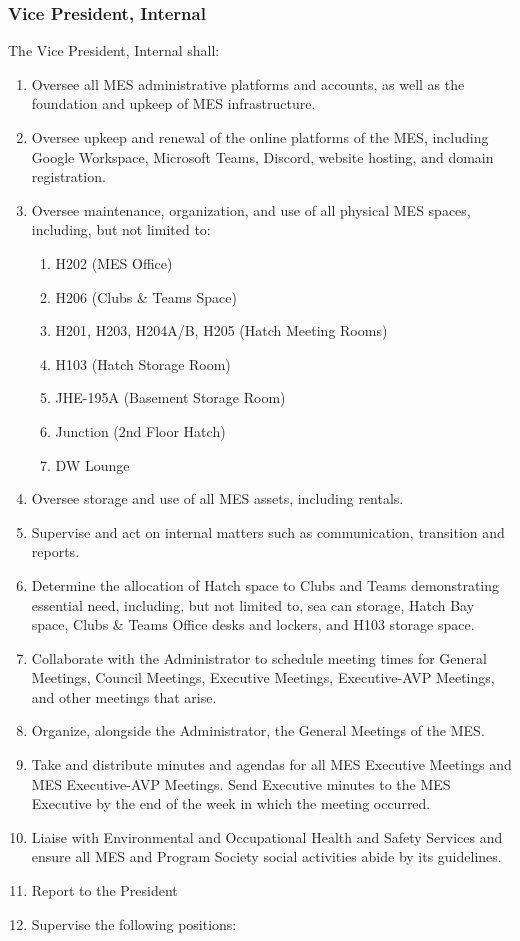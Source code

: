 \subsubsection{Vice President,
 Internal}
\label{vice-president-internal}
The Vice President, Internal shall:

\begin{enumerate}
 \item
  Oversee all MES administrative platforms and accounts, as well as the
  foundation and upkeep of MES infrastructure.
 \item
  Oversee upkeep and renewal of the online platforms of the MES,
  including Google Workspace, Microsoft Teams, Discord, website hosting,
  and domain registration.
 \item
  Oversee maintenance, organization, and use of all physical MES spaces,
  including, but not limited to:

  \begin{enumerate}
   \item
    H202 (MES Office)
   \item
    H206 (Clubs \& Teams Space)
   \item
    H201, H203, H204A/B, H205 (Hatch Meeting Rooms)
   \item
    H103 (Hatch Storage Room)
   \item
    JHE-195A (Basement Storage Room)
   \item
    Junction (2nd Floor Hatch)
   \item
    DW Lounge
  \end{enumerate}
 \item
  Oversee storage and use of all MES assets, including rentals.
 \item
  Supervise and act on internal matters such as communication,
  transition and reports.
 \item
  Determine the allocation of Hatch space to Clubs and Teams
  demonstrating essential need, including, but not limited to, sea can
  storage, Hatch Bay space, Clubs \& Teams Office desks and lockers, and
  H103 storage space.
 \item
  Collaborate with the Administrator to schedule meeting times for
  General Meetings, Council Meetings, Executive Meetings, Executive-AVP
  Meetings, and other meetings that arise.
 \item
  Organize, alongside the Administrator, the General Meetings of the
  MES.
 \item
  Take and distribute minutes and agendas for all MES Executive Meetings
  and MES Executive-AVP Meetings. Send Executive minutes to the MES
  Executive by the end of the week in which the meeting occurred.
 \item
  Liaise with Environmental and Occupational Health and Safety Services
  and ensure all MES and Program Society social activities abide by its guidelines.
 \item
  Report to the President
 \item
  Supervise the following positions:


\end{enumerate}
